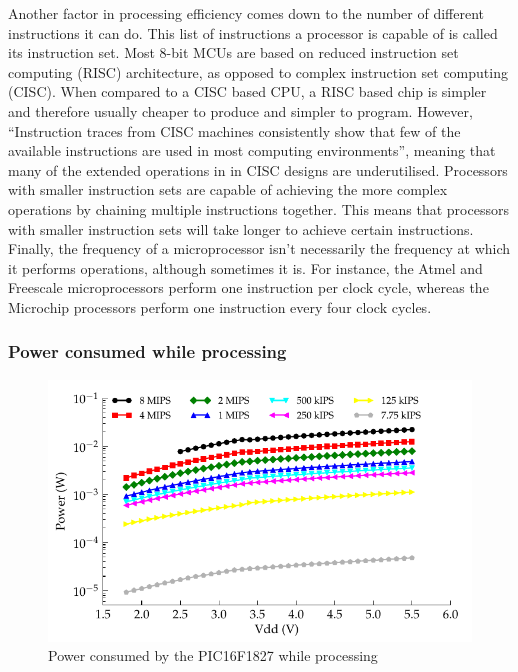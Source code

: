       Another factor in processing efficiency comes down to the number of different instructions it can do.
      This list of instructions a processor is capable of is called its instruction set.
      Most 8-bit MCUs are based on reduced instruction set computing (RISC) architecture, as opposed to complex instruction set computing (CISC).
      When compared to a CISC based CPU, a RISC based chip is simpler and therefore usually cheaper to produce and simpler to program.
      However, ``Instruction traces from CISC machines consistently show that few of the available instructions are used in most computing environments''\cite{ComputerArch}, meaning that many of the extended operations in in CISC designs are underutilised.
      Processors with smaller instruction sets are capable of achieving the more complex operations by chaining multiple instructions together.
      This means that processors with smaller instruction sets will take longer to achieve certain instructions.
      Finally, the frequency of a microprocessor isn't necessarily the frequency at which it performs operations, although sometimes it is.
      For instance, the Atmel and Freescale microprocessors perform one instruction per clock cycle, whereas the Microchip processors perform one instruction every four clock cycles.


    \subsubsection*{Power consumed while processing}

      \begin{figure}
        \centering
        \includegraphics{content/pt1/03-EnergyRequirements/graphics/Graph_PIC16F1827_Clock_Power}
        \caption{\label{graph:CLK_POWER_16F1827}Power consumed by the PIC16F1827 while processing}
      \end{figure}

